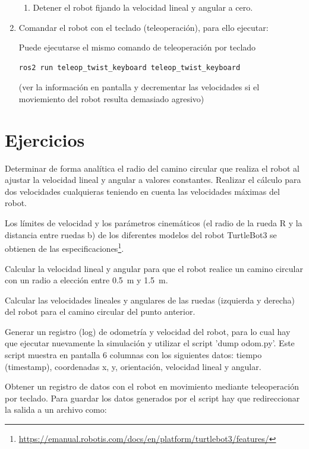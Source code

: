 \documentclass[tp]{lcc}
\begin{document}
\begin{enumerate}
\begin{enumerate}
	\item Detener el robot fijando la velocidad lineal y angular a cero.
	\end{enumerate}

\item Comandar el robot con el teclado (teleoperación), para ello ejecutar:

Puede ejecutarse el mismo comando de teleoperación por teclado
\begin{lstlisting}[style=bash] 
ros2 run teleop_twist_keyboard teleop_twist_keyboard
\end{lstlisting}
(ver la información en pantalla y decrementar las velocidades si el moviemiento del robot
resulta demasiado agresivo)
\end{enumerate}


\section{Ejercicios}

\ejercicio  Determinar de forma analítica el radio del camino circular que realiza el robot al ajustar la velocidad lineal y angular a valores constantes. Realizar el cálculo para dos velocidades cualquieras teniendo en cuenta las velocidades máximas del robot.

\nota Los límites de velocidad y los parámetros cinemáticos (el radio de la rueda R y la distancia entre ruedas b) de los diferentes modelos del robot TurtleBot3 se obtienen de las especificaciones\footnote{\url{https://emanual.robotis.com/docs/en/platform/turtlebot3/features/}}.

\ejercicio  Calcular la velocidad lineal y angular para que el robot realice un camino circular con un radio a elección entre \SI{0.5}{\meter} y \SI{1.5}{\meter}.

\ejercicio  Calcular las velocidades lineales y angulares de las ruedas (izquierda y derecha) del robot para el camino circular del punto anterior.

\ejercicio Generar un registro (log) de odometría y velocidad del robot, para lo cual hay que ejecutar nuevamente
la simulación y utilizar el script ’dump odom.py’. Este script muestra en pantalla 6 columnas con los siguientes datos: tiempo (timestamp), coordenadas x, y, orientación, velocidad lineal y angular.

\ejercicio Obtener un registro de datos con el robot en movimiento mediante teleoperación por teclado. Para guardar los datos generados por el script hay que redireccionar la salida a un archivo como:
\end{document}
